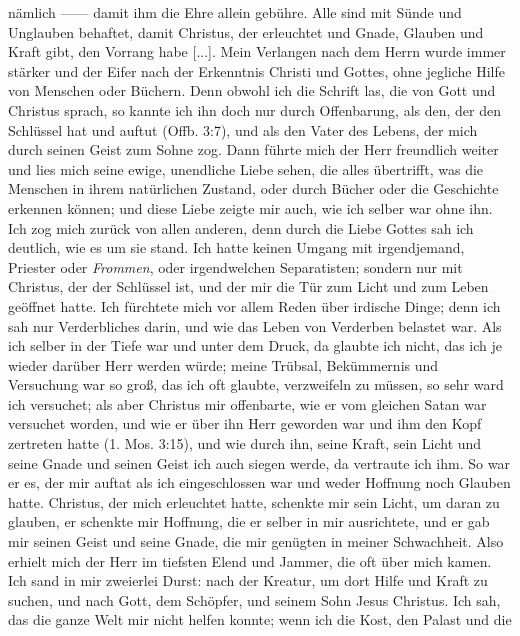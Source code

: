 nämlich —— damit ihm die Ehre allein gebühre. Alle sind mit
Sünde und Unglauben behaftet, damit Christus, der erleuchtet
und Gnade, Glauben und Kraft gibt, den Vorrang habe [...].
Mein Verlangen nach dem Herrn wurde immer stärker und der
Eifer nach der Erkenntnis Christi und Gottes, ohne jegliche Hilfe
von Menschen oder Büchern. Denn obwohl ich die Schrift las,
die von Gott und Christus sprach, so kannte ich ihn doch nur
durch Offenbarung, als den, der den Schlüssel hat und auftut
(Offb. 3:7), und als den Vater 
des Lebens, der mich durch seinen
Geist zum Sohne zog. Dann führte mich der Herr freundlich
weiter und lies mich seine ewige, unendliche Liebe sehen, die
alles übertrifft, was die Menschen in ihrem natürlichen Zustand,
oder durch Bücher oder die Geschichte erkennen können;
und diese Liebe zeigte mir auch, wie ich selber war ohne ihn.
Ich zog mich zurück von allen anderen, denn durch die Liebe
Gottes sah ich deutlich, wie es um sie stand. Ich hatte keinen
Umgang mit irgendjemand, Priester oder \textit{Frommen}, oder
irgendwelchen Separatisten; sondern nur mit Christus, der der
Schlüssel ist, und der mir die Tür zum Licht und zum Leben 
geöffnet hatte. Ich fürchtete mich vor allem Reden über irdische Dinge;
denn ich sah nur Verderbliches darin, und wie das Leben von 
Verderben belastet war. Als ich selber in der Tiefe war und unter dem
Druck, da glaubte ich nicht, das ich je wieder darüber Herr werden
würde; meine Trübsal, Bekümmernis und Versuchung war so
groß, das ich oft glaubte, verzweifeln zu müssen, so sehr ward
ich versuchet; als aber Christus mir offenbarte, wie er vom gleichen
Satan war versuchet worden, und wie er über ihn Herr geworden
war und ihm den Kopf zertreten hatte 
(1. Mos. 3:15), und wie durch
ihn, seine Kraft, sein Licht und seine Gnade und seinen Geist ich
auch siegen werde, da vertraute ich ihm. So war er es, der mir
auftat als ich eingeschlossen war und weder Hoffnung noch Glauben
hatte. Christus, der mich erleuchtet hatte, schenkte mir sein Licht,
um daran zu glauben, er schenkte mir Hoffnung, die er selber in
mir ausrichtete, und er gab mir seinen Geist und seine Gnade,
die mir genügten in meiner Schwachheit. Also erhielt mich der
Herr im tiefsten Elend und Jammer, die oft über mich kamen.
Ich sand in mir zweierlei Durst: nach der Kreatur, um dort
Hilfe und Kraft zu suchen, und nach Gott, dem Schöpfer, und
seinem Sohn Jesus Christus. Ich sah, das die ganze Welt mir
nicht helfen konnte; wenn ich die Kost, den Palast und die
